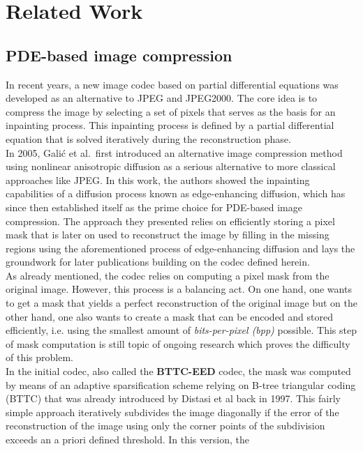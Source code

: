 \chapter{Related Work}\label{ch:RelatedWork}


\section{PDE-based image compression}

In recent years, a new image codec based on partial differential equations was developed as an
alternative to JPEG and JPEG2000. The core idea is to compress the image by selecting a set of
pixels that serves as the basis for an inpainting process. This inpainting process is defined by a
partial differential equation that is solved iteratively during the reconstruction phase.\\
In 2005, Galić et al.\cite{galic05}\ first introduced an alternative image compression method using nonlinear
anisotropic diffusion
 as
a serious alternative to more classical approaches like JPEG. In this
work, the authors showed the inpainting capabilities of a diffusion process known as edge-enhancing
diffusion, which has since then established itself as the prime choice for PDE-based image
compression. The approach they presented relies on efficiently storing a pixel mask that is later
on used to reconstruct the image by filling in the missing regions using the aforementioned process
of edge-enhancing diffusion and lays the groundwork for later publications building on the codec
defined herein. \\
As already mentioned, the codec relies on computing a pixel mask from the original image. However,
this process is a balancing act. On one hand, one wants to get a mask that yields a perfect
reconstruction of the original image but on the other hand, one also wants to create a mask that
can be encoded and stored efficiently, i.e. using the smallest amount of \textit{bits-per-pixel
(bpp)} possible. This step of mask computation is still topic of ongoing research which proves the
difficulty of this problem.\\
In the initial codec, also called the \textbf{BTTC-EED} codec, the mask was
computed by means of an adaptive sparsification scheme relying on B-tree triangular coding (BTTC)
that was already introduced by Distasi et al\cite{distasi97} back in 1997. This fairly simple
approach iteratively subdivides the image diagonally if the error of the reconstruction of the image using only
the corner points of the subdivision exceeds an a priori defined threshold. In this version, the
